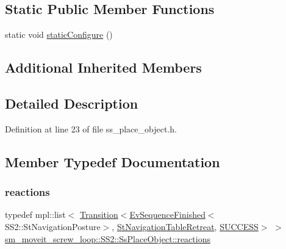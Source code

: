 \subsection*{Static Public Member Functions}
\begin{DoxyCompactItemize}
\item 
static void \hyperlink{structsm__moveit__screw__loop_1_1SS2_1_1SsPlaceObject_ae54a59c315bd61d98f91321a5950f1a8}{static\+Configure} ()
\end{DoxyCompactItemize}
\subsection*{Additional Inherited Members}


\subsection{Detailed Description}


Definition at line 23 of file ss\+\_\+place\+\_\+object.\+h.



\subsection{Member Typedef Documentation}
\mbox{\label{structsm__moveit__screw__loop_1_1SS2_1_1SsPlaceObject_a157c60be6e5eae6dc682bc5d163ce9ce}} 
\subsubsection{\texorpdfstring{reactions}{reactions}}
{\footnotesize\ttfamily typedef mpl\+::list$<$ \hyperlink{classsmacc_1_1Transition}{Transition}$<$\hyperlink{structsmacc_1_1default__events_1_1EvSequenceFinished}{Ev\+Sequence\+Finished}$<$S\+S2\+::\+St\+Navigation\+Posture$>$, \hyperlink{structsm__moveit__screw__loop_1_1StNavigationTableRetreat}{St\+Navigation\+Table\+Retreat}, \hyperlink{structsmacc_1_1default__transition__tags_1_1SUCCESS}{S\+U\+C\+C\+E\+SS}$>$ $>$ \hyperlink{structsm__moveit__screw__loop_1_1SS2_1_1SsPlaceObject_a157c60be6e5eae6dc682bc5d163ce9ce}{sm\+\_\+moveit\+\_\+screw\+\_\+loop\+::\+S\+S2\+::\+Ss\+Place\+Object\+::reactions}}



